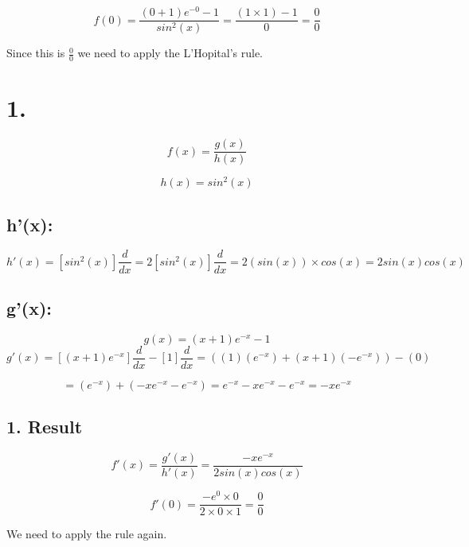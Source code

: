 \begin{solutionbox}{}

\[
    f(0) = \frac{(0+1)e^{-0}-1}{sin^2(x)} = \frac{(1 \times 1) - 1}{0} = \frac{0}{0}
\]

Since this is $\frac{0}{0}$ we need to apply the L'Hopital's rule.

\section*{1.}
\[
    f(x) = \frac{g(x)}{h(x)}
\]

\[
    h(x) = sin^2(x)
\]

\subsection*{h'(x):}
\[
    h'(x) = [sin^2(x)] \frac{d}{dx} = 2[sin^2(x)] \frac{d}{dx} = 2(sin(x))\times cos(x) = 2sin(x)cos(x)
\]


\subsection*{g'(x):}
\[
    g(x) = (x + 1)e^{-x}-1
\]
\[
    g'(x) = [(x + 1)e^{-x}]\frac{d}{dx} - [1] \frac{d}{dx} = ((1)(e^{-x}) + (x + 1)(-e^{-x})) - (0)
\]

\[
    = (e^{-x}) + (-xe^{-x} - e^{-x}) = e^{-x} - xe^{-x} - e^{-x} = -xe^{-x}
\]

\subsection*{1. Result}
\[
    f'(x) = \frac{g'(x)}{h'(x)} = \frac{-xe^{-x}}{2sin(x)cos(x)}
\]

\[
    f'(0) = \frac{-e^{0} \times 0}{2\times0\times1} = \frac{0}{0}
\]

We need to apply the rule again.

\end{solutionbox}\newpage
